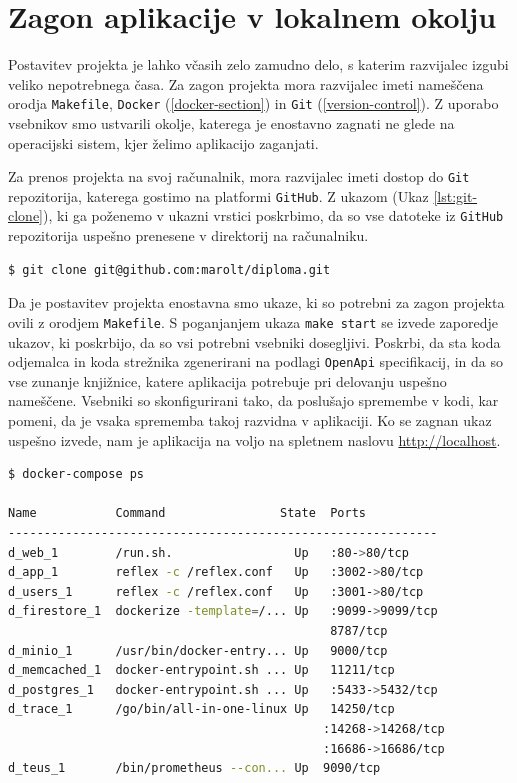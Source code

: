 \documentclass[a4paper, 12pt]{book}
\begin{document}
\section{Zagon aplikacije v lokalnem okolju}
Postavitev projekta je lahko včasih zelo zamudno delo, s katerim razvijalec izgubi veliko nepotrebnega časa. Za zagon projekta mora razvijalec imeti nameščena orodja \verb=Makefile=, \verb=Docker= (\ref{docker-section}) in \verb=Git= (\ref{version-control}). Z uporabo vsebnikov smo ustvarili okolje, katerega je enostavno zagnati ne glede na operacijski sistem, kjer želimo aplikacijo zaganjati.

Za prenos projekta na svoj računalnik, mora razvijalec imeti dostop do \verb=Git= repozitorija, katerega gostimo na platformi \verb=GitHub=. Z ukazom (Ukaz \ref{lst:git-clone}), ki ga poženemo v ukazni vrstici poskrbimo, da so vse datoteke iz \verb=GitHub= repozitorija uspešno prenesene v direktorij na računalniku.

\begin{lstlisting}[language=bash,style=mystyle,caption={Ukaz za prenos datotek iz GitHub repozitorija},label=lst:git-clone]
$ git clone git@github.com:marolt/diploma.git
\end{lstlisting}

Da je postavitev projekta enostavna smo ukaze, ki so potrebni za zagon projekta ovili z orodjem \verb=Makefile=. S poganjanjem ukaza \verb=make start= se izvede zaporedje ukazov, ki poskrbijo, da so vsi potrebni vsebniki dosegljivi. Poskrbi, da sta koda odjemalca in koda strežnika zgenerirani na podlagi \verb=OpenApi= specifikacij, in da so vse zunanje knjižnice, katere aplikacija potrebuje pri delovanju uspešno nameščene. Vsebniki so skonfigurirani tako, da poslušajo spremembe v kodi, kar pomeni, da je vsaka sprememba takoj razvidna v aplikaciji. Ko se zagnan ukaz uspešno izvede, nam je aplikacija na voljo na spletnem naslovu \url{http://localhost}.


\begin{lstlisting}[language=bash,style=mystyle,caption={Prikaz zagnanih vsebnikov.},label=lst:running-containers]
$ docker-compose ps

Name           Command                State  Ports
------------------------------------------------------------
d_web_1        /run.sh.                 Up   :80->80/tcp
d_app_1        reflex -c /reflex.conf   Up   :3002->80/tcp
d_users_1      reflex -c /reflex.conf   Up   :3001->80/tcp 
d_firestore_1  dockerize -template=/... Up   :9099->9099/tcp             
                                             8787/tcp
d_minio_1      /usr/bin/docker-entry... Up   9000/tcp     
d_memcached_1  docker-entrypoint.sh ... Up   11211/tcp     
d_postgres_1   docker-entrypoint.sh ... Up   :5433->5432/tcp       
d_trace_1      /go/bin/all-in-one-linux Up   14250/tcp 
                                            :14268->14268/tcp
                                            :16686->16686/tcp
d_teus_1       /bin/prometheus --con... Up  9090/tcp     
\end{lstlisting}
\end{document}
